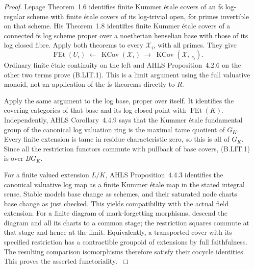 \begin{proof}
Lepage Theorem~1.6 identifies finite Kummer \'etale covers of an
fs log-regular scheme with finite \'etale covers of its log-trivial
open, for primes invertible on that scheme. His Theorem~1.8
identifies finite Kummer \'etale covers of a connected fs log
scheme proper over a noetherian henselian base with those of its
log closed fibre. Apply both theorems to every $\mathscr X_i$,
with all primes. They give
\[
 \operatorname{FEt}(U_i)\ \longleftarrow\
 \operatorname{KCov}(\mathscr X_i)\ \longrightarrow\
 \operatorname{KCov}(\mathscr X_{i,s_i}).
\]
Ordinary finite \'etale continuity on the left and AHLS
Proposition~4.2.6 on the other two terms prove (B.LIT.1).
This is a limit argument using the full valuative monoid, not an
application of the fs theorems directly to $R$.
\citep[Theorems~1.6 and 1.8]{Lepage2013}

Apply the same argument to the log base, proper over itself.
It identifies the covering categories of that base and its log
closed point with $\operatorname{FEt}(K)$. Independently, AHLS
Corollary~4.4.9 says that the Kummer \'etale fundamental group of
the canonical log valuation ring is the maximal tame quotient of
$G_K$. Every finite extension is tame in residue characteristic
zero, so this is all of $G_K$. Since all the restriction functors
commute with pullback of base covers, (B.LIT.1) is over $BG_K$.

For a finite valued extension $L/K$, AHLS Proposition~4.4.3
identifies the canonical valuative log map as a finite Kummer
\'etale map in the stated integral sense. Stable models base
change as schemes, and their saturated node charts base change
as just checked. This yields compatibility with the actual field
extension. For a finite diagram of mark-forgetting morphisms,
descend the diagram and all its charts to a common stage; the
restriction squares commute at that stage and hence at the limit.
Equivalently, a transported cover with its specified restriction
has a contractible groupoid of extensions by full faithfulness.
The resulting comparison isomorphisms therefore satisfy their
cocycle identities. This proves the asserted functoriality.
\citep[Proposition~4.4.3, Corollary~4.4.9]{LA_AHLS2024}
\end{proof}

